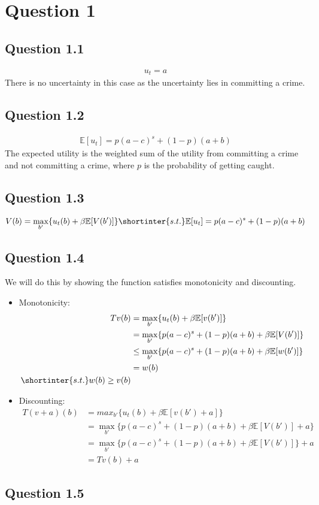 

\section{Question 1}
\subsection{Question 1.1}
\begin{align*}
  u_t = a
\end{align*}
There is no uncertainty in this case as the uncertainty lies in committing a crime.

\subsection{Question 1.2}
\begin{align*}
  \mathbb{E}[u_t] = p(a-c)^s + (1-p)(a+b)
\end{align*}
The expected utility is the weighted sum of the utility from committing a crime and not committing a crime, where \( p \) is the probability of getting caught.

\subsection{Question 1.3}
\begin{align*}
  V(b) = \max_{b'} \{u_t(b) + \beta\mathbb{E}[V(b')]\}
  \shortinter{s.t.} \mathbb{E}[u_t] = p(a-c)^s + (1-p)(a+b)
\end{align*}

\subsection{Question 1.4}
We will do this by showing the function satisfies monotonicity and discounting.
\begin{itemize}
  \item Monotonicity: 
    \begin{align*}
      Tv(b) &= \max_{b'} \{u_t(b) + \beta\mathbb{E}[v(b')]\} \\
      & = \max_{b'} \{p(a-c)^s + (1-p)(a+b) + \beta\mathbb{E}[V(b')]\} \\
      & \leq \max_{b'} \{p(a-c)^s + (1-p)(a+b) + \beta\mathbb{E}[w(b')]\} \\
      & = w(b) \\
      \shortinter{s.t.} w(b)\geq v(b)
    \end{align*}
  \item Discounting:
    \begin{align*}
      T(v+a)(b) &= max_{b'} \{u_t(b) + \beta\mathbb{E}[v(b')+a]\} \\
      & = \max_{b'} \{p(a-c)^s + (1-p)(a+b) + \beta\mathbb{E}[V(b')]+a\} \\
      & = \max_{b'} \{p(a-c)^s + (1-p)(a+b) + \beta\mathbb{E}[V(b')]\} + a \\
      & = Tv(b) + a
    \end{align*}
\end{itemize}
\subsection{Question 1.5}


